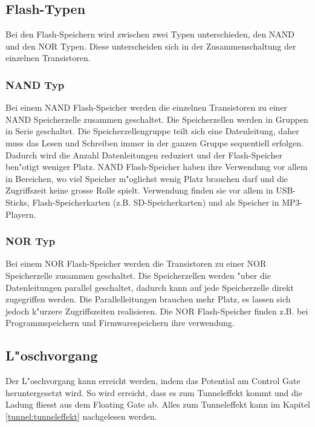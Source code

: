 \begin{refsection}
\subsection{Flash-Typen}
Bei den Flash-Speichern wird zwischen zwei Typen unterschieden, den NAND
und den NOR Typen.
Diese unterscheiden sich in der Zusammenschaltung der einzelnen Transistoren.

\subsubsection{NAND Typ}
Bei einem NAND Flash-Speicher werden die einzelnen Transistoren zu einer
NAND Speicherzelle zusammen geschaltet.
Die Speicherzellen werden in Gruppen in Serie geschaltet.
Die Speicherzellengruppe teilt sich eine Datenleitung, daher muss das
Lesen und Schreiben immer in der ganzen Gruppe sequentiell erfolgen.
Dadurch wird die Anzahl Datenleitungen reduziert und der Flash-Speicher
ben"otigt weniger Platz.
NAND Flash-Speicher haben ihre Verwendung vor allem in Bereichen, wo viel
Speicher m"oglichst wenig Platz brauchen darf und die Zugriffszeit keine
grosse Rolle spielt.
Verwendung finden sie vor allem in USB-Sticks, Flash-Speicherkarten
(z.B. SD-Speicherkarten) und als Speicher in MP3-Playern.

\subsubsection{NOR Typ}
Bei einem NOR Flash-Speicher werden die Transistoren zu einer NOR
Speicherzelle zusammen geschaltet.
Die Speicherzellen werden "uber die Datenleitungen parallel geschaltet,
dadurch kann auf jede Speicherzelle direkt zugegriffen werden.
Die Parallelleitungen brauchen mehr Platz, es lassen sich jedoch k"urzere
Zugriffszeiten realisieren.
Die NOR Flash-Speicher finden z.B. bei Programmspeichern und Firmwarespeichern
ihre verwendung.

\subsection{L"oschvorgang}
Der L"oschvorgang kann erreicht werden, indem das Potential am 
Control Gate heruntergesetzt wird.
So wird erreicht, dass es zum Tunneleffekt kommt und die Ladung fliesst
aus dem Floating Gate ab.
Alles zum Tunneleffekt kann im Kapitel \ref{tunnel:tunneleffekt} nachgelesen werden.


\end{refsection}
